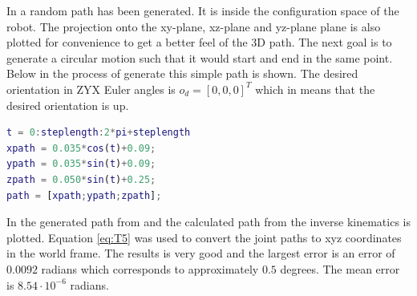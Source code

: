 In  a random path has been generated. It is inside the configuration space of the robot. The projection onto the xy-plane, xz-plane and yz-plane plane is also plotted for convenience to get a better feel of the 3D path. The next goal is to generate a circular motion such that it would start and end in the same point. Below in  the process of generate this simple path is shown. The desired orientation in ZYX Euler angles is $o_d = [0,0,0]^T$ which in means that the desired orientation is up.
\begin{lstlisting}[caption={MATLAB code for creating path},label={lst:path},language=Matlab]
t = 0:steplength:2*pi+steplength
xpath = 0.035*cos(t)+0.09;
ypath = 0.035*sin(t)+0.09;
zpath = 0.050*sin(t)+0.25;
path = [xpath;ypath;zpath];
\end{lstlisting}
In  the generated path from  and the calculated path from the inverse kinematics is plotted. Equation \eqref{eq:T5} was used to convert the joint paths to xyz coordinates in the world frame. The results is very good and the largest error is an error of $0.0092$ radians which corresponds to approximately $0.5$ degrees. The mean error is $8.54\cdot10^{-6}$ radians. 

